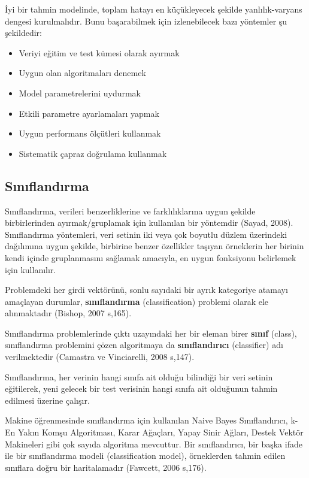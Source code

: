 \documentclass[12pt,twoside]{deuthesis}
\providecommand{\tightlist}{%
  \setlength{\itemsep}{0pt}\setlength{\parskip}{0pt}}
\begin{document}
İyi bir tahmin modelinde, toplam hatayı en küçükleyecek şekilde yanlılık-varyans dengesi kurulmalıdır. Bunu başarabilmek için izlenebilecek bazı yöntemler şu şekildedir:
\begin{itemize}
\tightlist
\item
  Veriyi eğitim ve test kümesi olarak ayırmak
\item
  Uygun olan algoritmaları denemek
\item
  Model parametrelerini uydurmak
\item
  Etkili parametre ayarlamaları yapmak
\item
  Uygun performans ölçütleri kullanmak
\item
  Sistematik çapraz doğrulama kullanmak
\end{itemize}
\hypertarget{sux131nux131flandux131rma}{%
\subsection{Sınıflandırma}\label{sux131nux131flandux131rma}}

Sınıflandırma, verileri benzerliklerine ve farklılıklarına uygun şekilde birbirlerinden ayırmak/gruplamak için kullanılan bir yöntemdir (Sayad, 2008). Sınıflandırma yöntemleri, veri setinin iki veya çok boyutlu düzlem üzerindeki dağılımına uygun şekilde, birbirine benzer özellikler taşıyan örneklerin her birinin kendi içinde gruplanmasını sağlamak amacıyla, en uygun fonksiyonu belirlemek için kullanılır.

Problemdeki her girdi vektörünü, sonlu sayıdaki bir ayrık kategoriye atamayı amaçlayan durumlar, \textbf{sınıflandırma} (classification) problemi olarak ele alınmaktadır (Bishop, 2007 s,165).

Sınıflandırma problemlerinde çıktı uzayındaki her bir eleman birer \textbf{sınıf} (class), sınıflandırma problemini çözen algoritmaya da \textbf{sınıflandırıcı} (classifier) adı verilmektedir (Camastra ve Vinciarelli, 2008 s,147).

Sınıflandırma, her verinin hangi sınıfa ait olduğu bilindiği bir veri setinin eğitilerek, yeni gelecek bir test verisinin hangi sınıfa ait olduğunun tahmin edilmesi üzerine çalışır.

Makine öğrenmesinde sınıflandırma için kullanılan Naive Bayes Sınıflandırıcı, k-En Yakın Komşu Algoritması, Karar Ağaçları, Yapay Sinir Ağları, Destek Vektör Makineleri gibi çok sayıda algoritma mevcuttur. Bir sınıflandırıcı, bir başka ifade ile bir sınıflandırma modeli (classification model), örneklerden tahmin edilen sınıflara doğru bir haritalamadır (Fawcett, 2006 s,176).
\end{document}
